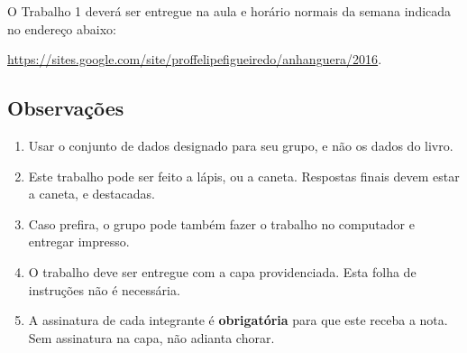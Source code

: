 \documentclass[a4paper]{article}
\begin{document}
O Trabalho 1 deverá ser entregue na aula e horário normais da semana indicada no endereço abaixo:

\url{https://sites.google.com/site/proffelipefigueiredo/anhanguera/2016}.

\subsection{Observações}

\begin{enumerate}
\item Usar o conjunto de dados designado para seu grupo, e não os dados do livro.
\item Este trabalho pode ser feito a lápis, ou a caneta. Respostas finais devem estar a caneta, e destacadas. 
\item Caso prefira, o grupo pode também fazer o trabalho no computador e entregar impresso.
\item O trabalho deve ser entregue com a capa providenciada. Esta folha de instruções não é necessária.
\item A assinatura de cada integrante é {\bf obrigatória} para que este receba a nota. Sem assinatura na capa, não adianta chorar.
\end{enumerate}
\end{document}
